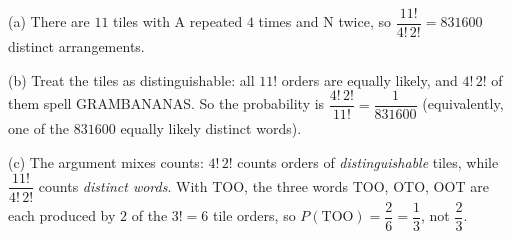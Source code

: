 (a) There are $11$ tiles with A repeated $4$ times and N twice, so $\dfrac{11!}{4!\,2!}=\boxed{831600}$ distinct arrangements.

(b) Treat the tiles as distinguishable: all $11!$ orders are equally likely, and $4!\,2!$ of them spell GRAMBANANAS. So the probability is $\dfrac{4!\,2!}{11!}=\boxed{\dfrac1{831600}}$ (equivalently, one of the $831600$ equally likely distinct words).

(c) The argument mixes counts: $4!\,2!$ counts orders of \emph{distinguishable} tiles, while $\dfrac{11!}{4!\,2!}$ counts \emph{distinct words}. With TOO, the three words TOO, OTO, OOT are each produced by $2$ of the $3!=6$ tile orders, so $P(\text{TOO})=\dfrac26=\dfrac13$, not $\dfrac23$.
